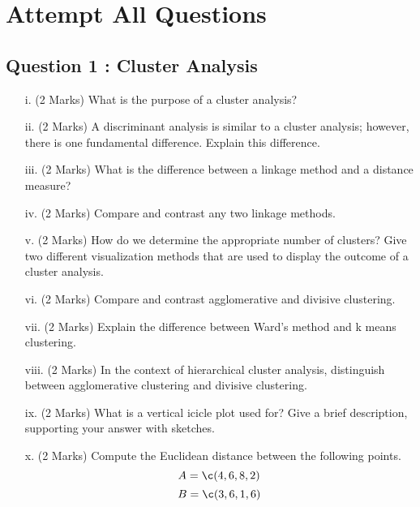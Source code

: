 \documentclass[a4paper,12pt]{article}
\begin{document}
\section*{Attempt All Questions}




\subsection*{Question 1 : Cluster Analysis}

\begin{itemize}
\item[i.](2 Marks) What is the purpose of a cluster analysis?

\item[ii.](2 Marks)  A discriminant analysis is similar to a cluster analysis; however, there is one fundamental difference.  Explain this difference.

\item[iii.](2 Marks)  What is the difference between a linkage method and a distance measure?

\item[iv.](2 Marks)  Compare and contrast any two linkage methods.

\item[v.](2 Marks)  How do we determine the appropriate number of clusters?  Give two different visualization methods that are used to display the outcome of a cluster analysis.
\item[vi.](2 Marks)  Compare and contrast agglomerative and divisive clustering.
\item[vii.](2 Marks)  Explain the difference between Ward's method and k means
 clustering.
\end{itemize}
\begin{itemize}
\item[viii.](2 Marks)  In the context of hierarchical cluster analysis, distinguish between agglomerative clustering and divisive clustering.
\item[ix.](2 Marks)  What is a vertical icicle plot used for? Give a brief description, supporting your answer with sketches.
\item[x.](2 Marks)  Compute the Euclidean distance between the following points.
\[ A = \c(4,6,8,2)\]
\[ B = \c(3,6,1,6)\]

\end{itemize}
\newpage
\end{document}
